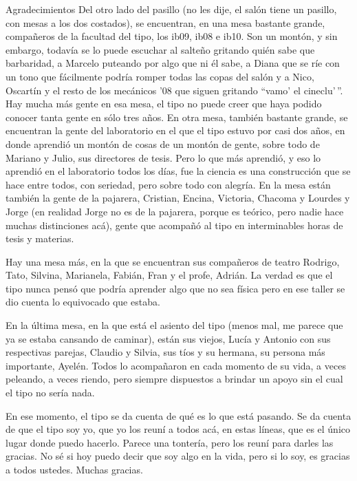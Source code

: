 \documentclass[12pt,papel,singlespace,oneside]{ibtesis}
\begin{document}
\begin{postliminary}
\begin{seccion}{Agradecimientos}
Del otro lado del pasillo (no les dije, el salón tiene un pasillo, con mesas a los dos costados), se encuentran, en una mesa bastante grande, compañeros de la facultad del tipo, los ib09, ib08 e ib10. Son un montón, y sin embargo, todavía se lo puede escuchar al salteño gritando quién sabe que barbaridad, a Marcelo puteando por algo que ni él sabe, a Diana que se ríe con un tono que fácilmente podría romper todas las copas del salón y a Nico, Oscartín y el resto de los mecánicos '08 que siguen gritando ``vamo' el cineclu'\,''. Hay mucha más gente en esa mesa, el tipo no puede creer que haya podido conocer tanta gente en sólo tres años.
\newpage
En otra mesa, también bastante grande, se encuentran la gente del laboratorio en el que el tipo estuvo por casi dos años, en donde aprendió un montón de cosas de un montón de gente, sobre todo de Mariano y Julio, sus directores de tesis. Pero lo que más aprendió, y eso lo aprendió en el laboratorio todos los días, fue la ciencia es una construcción que se hace entre todos, con seriedad, pero sobre todo con alegría. En la mesa están también la gente de la pajarera, Cristian, Encina, Victoria, Chacoma y Lourdes y Jorge (en realidad Jorge no es de la pajarera, porque es teórico, pero nadie hace muchas distinciones acá), gente que acompañó al tipo en interminables horas de tesis y materias.

Hay una mesa más, en la que se encuentran sus compañeros de teatro Rodrigo, Tato, Silvina, Marianela, Fabián, Fran y el profe, Adrián. La verdad es que el tipo nunca pensó que podría aprender algo que no sea física pero en ese taller se dio cuenta lo equivocado que estaba.

En la última mesa, en la que está el asiento del tipo (menos mal, me parece que ya se estaba cansando de caminar), están sus viejos, Lucía y Antonio con sus respectivas parejas, Claudio y Silvia, sus tíos y su hermana, su persona más importante, Ayelén. Todos lo acompañaron en cada momento de su vida, a veces peleando, a veces riendo, pero siempre dispuestos a brindar un apoyo sin el cual el tipo no sería nada.

En ese momento, el tipo se da cuenta de qué es lo que está pasando. Se da cuenta de que el tipo soy yo, que yo los reuní a todos acá, en estas líneas, que es el único lugar donde puedo hacerlo. Parece una tontería, pero los reuní para darles las gracias. No sé si hoy puedo decir que soy algo en la vida, pero si lo soy, es gracias a todos ustedes. Muchas gracias.


\end{seccion}
\end{postliminary}
\end{document}
